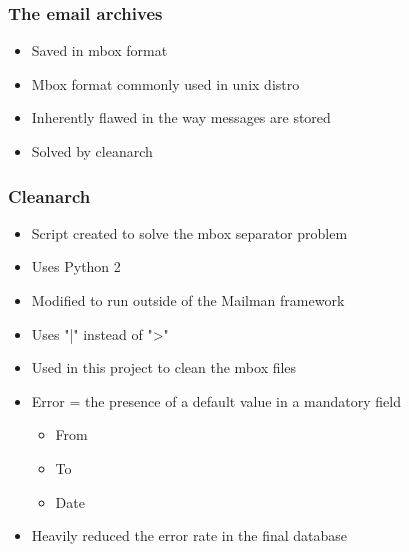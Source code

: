 \documentclass{beamer}
\begin{document}
\begin{frame}
\frametitle{The email archives }

\begin{itemize}

\item Saved in mbox format
\item Mbox format commonly used in unix distro
\item Inherently flawed in the way messages are stored
\item Solved by cleanarch


\end{itemize}
\end{frame}

\begin{frame}

\frametitle{Cleanarch}

\begin{itemize}
\item Script created to solve the mbox separator problem\\
\item Uses Python 2
\item Modified to run outside of the Mailman framework\\
\item Uses "|" instead of ">"\\
\item Used in this project to clean the mbox files\\

\item Error = the presence of a default value in a mandatory field \\
\begin{itemize}

\item From

\item To

\item Date

\end{itemize}
\item Heavily reduced the error rate in the final database\\


\end{itemize}

\end{frame}
\end{document}
